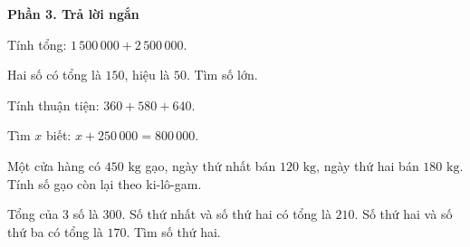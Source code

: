 \textbf{Phần 3. Trả lời ngắn}

\begin{ex} %
Tính tổng: $1\,500\,000 + 2\,500\,000$.
\end{ex}

\begin{ex} %
Hai số có tổng là $150$, hiệu là $50$. Tìm số lớn.
\end{ex}

\begin{ex} %
Tính thuận tiện: $360 + 580 + 640$.
\end{ex}

\begin{ex} %
Tìm $x$ biết: $x + 250\,000 = 800\,000$.
\end{ex}

\begin{ex} %
Một cửa hàng có $450\text{ kg}$ gạo, ngày thứ nhất bán $120\text{ kg}$, ngày thứ hai bán $180\text{ kg}$. Tính số gạo còn lại theo ki-lô-gam.
\end{ex}

\begin{ex} %
Tổng của 3 số là $300$. Số thứ nhất và số thứ hai có tổng là $210$. Số thứ hai và số thứ ba có tổng là $170$. Tìm số thứ hai.
\end{ex}
